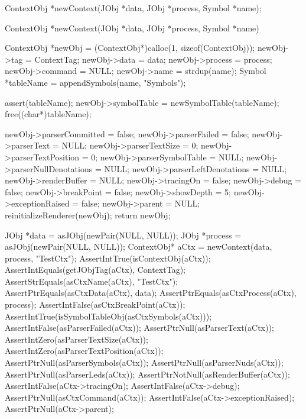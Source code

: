 \startTestSuite[newContext]

\startCHeader
ContextObj *newContext(JObj *data, JObj *process, Symbol *name);
\stopCHeader

\startCCode
ContextObj *newContext(JObj *data, JObj *process, Symbol *name) {
  ContextObj *newObj =
    (ContextObj*)calloc(1, sizeof(ContextObj));
  newObj->tag                   = ContextTag;
  newObj->data                  = data;
  newObj->process               = process;
  newObj->command               = NULL;
  newObj->name                  = strdup(name);
  Symbol *tableName             = appendSymbols(name, "Symbols");
  
  assert(tableName);
  newObj->symbolTable           = newSymbolTable(tableName);
  free((char*)tableName);
  
  newObj->parserCommitted       = false;
  newObj->parserFailed          = false;
  newObj->parserText            = NULL;
  newObj->parserTextSize        = 0;
  newObj->parserTextPosition    = 0;
  newObj->parserSymbolTable     = NULL;
  newObj->parserNullDenotations = NULL;
  newObj->parserLeftDenotations = NULL;
  newObj->renderBuffer          = NULL;
  newObj->tracingOn             = false;
  newObj->debug                 = false;
  newObj->breakPoint            = false;
  newObj->showDepth             = 5;
  newObj->exceptionRaised       = false;
  newObj->parent                = NULL;
  reinitializeRenderer(newObj);
  return newObj;
}
\stopCCode


\startCTest
  JObj *data       = asJObj(newPair(NULL, NULL));
  JObj *process    = asJObj(newPair(NULL, NULL));
  ContextObj* aCtx = newContext(data, process, "TestCtx");
  AssertIntTrue(isContextObj(aCtx));
  AssertIntEquals(getJObjTag(aCtx), ContextTag);
  AssertStrEquals(asCtxName(aCtx), "TestCtx");
  AssertPtrEquals(asCtxData(aCtx), data);
  AssertPtrEquals(asCtxProcess(aCtx), process);
  AssertIntFalse(asCtxBreakPoint(aCtx));
  AssertIntTrue(isSymbolTableObj(asCtxSymbols(aCtx)));
  AssertIntFalse(asParserFailed(aCtx));
  AssertPtrNull(asParserText(aCtx));
  AssertIntZero(asParserTextSize(aCtx));
  AssertIntZero(asParserTextPosition(aCtx));
  AssertPtrNull(asParserSymbols(aCtx));
  AssertPtrNull(asParserNuds(aCtx));
  AssertPtrNull(asParserLeds(aCtx));
  AssertPtrNotNull(asRenderBuffer(aCtx));
  AssertIntFalse(aCtx->tracingOn);
  AssertIntFalse(aCtx->debug);
  AssertPtrNull(asCtxCommand(aCtx));
  AssertIntFalse(aCtx->exceptionRaised);
  AssertPtrNull(aCtx->parent);
\stopCTest
\stopTestCase
\stopTestSuite

